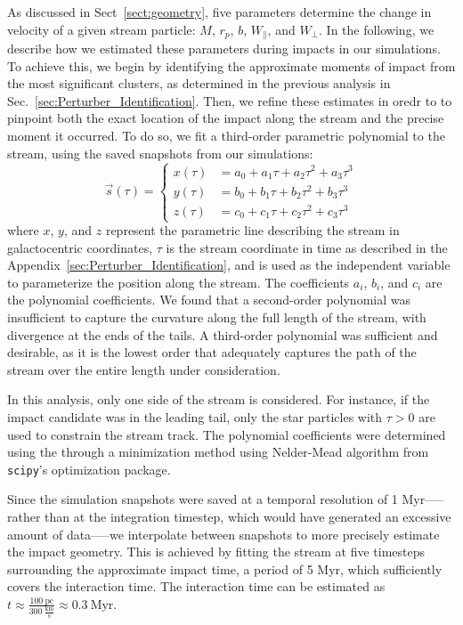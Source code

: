 \documentclass[draft]{aa}
\begin{document}
\begin{appendix}
    As discussed in Sect~\ref{sect:geometry},  five parameters determine the change in velocity of a given stream particle: $M$, $r_p$, $b$, $W_\parallel$, and $W_\perp$. In the following, we describe how we estimated these parameters during impacts in our simulations.
    To achieve this, we begin by identifying the approximate moments of impact from the most significant clusters, as determined in the previous analysis in Sec.~\ref{sec:Perturber_Identification}. Then, we refine these estimates in oredr to to pinpoint both the exact location of the impact along the stream and the precise moment it occurred. To do so, we fit a third-order parametric polynomial to the stream, using the saved snapshots from our simulations:
      \begin{equation}
        \vec{s}(\tau) = 
        \left\{
          \begin{aligned}
            x(\tau) &= a_0 + a_1 \tau + a_2 \tau^2 + a_3 \tau^3 \\ 
            y(\tau) &= b_0 + b_1 \tau + b_2 \tau^2 + b_3 \tau^3 \\
            z(\tau) &= c_0 + c_1 \tau + c_2 \tau^2 + c_3 \tau^3
          \end{aligned}
        \right.
        \end{equation}  
      where $x$, $y$, and $z$ represent the parametric line describing the stream in galactocentric coordinates, $\tau$ is the stream coordinate in time as described in the Appendix~\ref{sec:Perturber_Identification}, and is used as the independent variable to parameterize the position along the stream. The coefficients $a_i$, $b_i$, and $c_i$ are the polynomial coefficients. We found that a second-order polynomial was insufficient to capture the curvature along the full length of the stream, with divergence at the ends of the tails. A third-order polynomial was sufficient and desirable, as it is the lowest order that adequately captures the path of the stream over the entire length under consideration.

      In this analysis, only one side of the stream is considered. For instance, if the impact candidate was in the leading tail, only the star particles with $\tau > 0$ are used to constrain the stream track. The polynomial coefficients were determined using the through a minimization method using Nelder-Mead algorithm from \texttt{scipy}'s optimization package.

      Since the simulation snapshots were saved at a temporal resolution of 1 Myr--—rather than at the integration timestep, which would have generated an excessive amount of data—--we interpolate between snapshots to more precisely estimate the impact geometry. This is achieved by fitting the stream at five timesteps surrounding the approximate impact time, a period of 5 Myr, which sufficiently covers the interaction time. The interaction time can be estimated as $t \approx \frac{100~\text{pc}}{300~\frac{\text{km}}{\text{s}}} \approx 0.3~\text{Myr}$.


\end{appendix}
\end{document}
